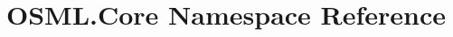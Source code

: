\hypertarget{namespaceOSML_1_1Core}{}\section{O\+S\+M\+L.\+Core Namespace Reference}
\label{namespaceOSML_1_1Core}
